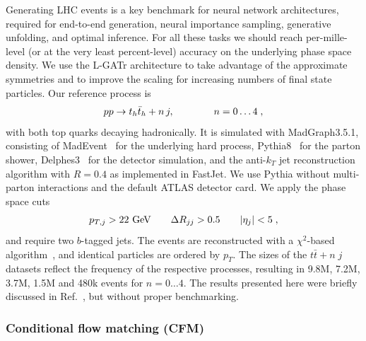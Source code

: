 \documentclass[submission, Phys]{SciPost}
\begin{document}
Generating LHC events is a key benchmark for neural network architectures, required for end-to-end generation, neural importance sampling, generative unfolding, and optimal inference. For all these tasks we should reach per-mille-level (or at the very least percent-level) accuracy on the underlying phase space density. We use the L-GATr architecture to take advantage of the approximate symmetries and to improve the scaling for increasing numbers of final state particles. Our reference process is 
%
\begin{align}
    pp\to t_h \bar t_h + n\, j , 
    \qquad\qquad n=0\dots 4 \; ,
\end{align}
%
with both top quarks decaying hadronically. It is simulated with MadGraph3.5.1, consisting of MadEvent~\cite{Alwall:2011uj} for the underlying hard process, Pythia8~\cite{Sjostrand:2014zea} for the parton shower, Delphes3~\cite{deFavereau:2013fsa} for the detector simulation, and the anti-$k_T$ jet reconstruction algorithm with $R=0.4$ as implemented in FastJet. We use Pythia without multi-parton interactions and the default ATLAS detector card. We apply the phase space cuts
%
\begin{align}
 p_{T,j} > 22~\text{GeV} 
 \qquad 
 \Delta R_{jj} > 0.5 
 \qquad |\eta_j| < 5 \; ,
\end{align} 
and require two $b$-tagged jets. The events are reconstructed with a $\chi^2$-based algorithm~\cite{ATLAS:2020ccu}, and identical particles are ordered by $p_T$. The sizes of the $t\bar t+n\; j$ datasets reflect the frequency of the respective processes, resulting in 9.8M, 7.2M, 3.7M, 1.5M and 480k events for $n=0 \ldots 4$. The results presented here were briefly discussed in Ref.~\cite{Spinner:2024hjm}, but without proper benchmarking.

\subsubsection*{Conditional flow matching (CFM)}
\end{document}
